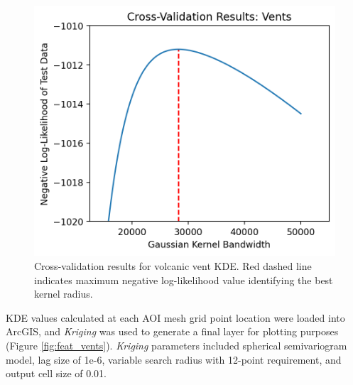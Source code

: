 \begin{figure}[H]
\centering
\includegraphics[scale=.60]{templates/images/Figure-Vents_kde_gridsearchcv_result.png}
\caption[Volcanic vent density parameter tuning]{Cross-validation results for volcanic vent KDE. Red dashed line indicates maximum negative log-likelihood value identifying the best kernel radius.}
\label{fig:vent_cv}
\end{figure}

KDE values calculated at each AOI mesh grid point location were loaded into ArcGIS, and \textit{Kriging} was used to generate a final layer for plotting purposes (Figure \ref{fig:feat_vents}). \textit{Kriging} parameters included spherical semivariogram model, lag size of 1e-6, variable search radius with 12-point requirement, and output cell size of 0.01. 
\vfill
\pagebreak

